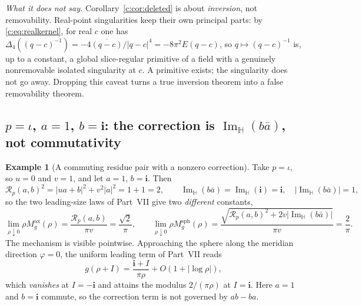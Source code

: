 \documentclass[11pt,a4paper]{article}
\numberwithin{equation}{section}
\theoremstyle{definition}
\newtheorem{example}[theorem]{Example}
\theoremstyle{remark}
\theoremstyle{plain}
\newcommand{\HH}{\mathbb H}
\DeclareMathOperator{\Ima}{Im}
\newcommand{\ImH}{\Ima_{\HH}}
\newcommand{\lap}{\Delta_4}
\newcommand{\Rp}{\mathcal R_{p}}      %
\newcommand{\Msph}{M^{\mathrm{sph}}}                  %
\newcommand{\Max}{M^{\mathrm{ax}}}                    %
\newcommand{\abs}[1]{\lvert #1\rvert}
\begin{document}
\emph{What it does not say.} Corollary~\ref{c:cor:deleted} is about
\emph{inversion}, not removability. Real-point singularities keep their own
principal parts: by \eqref{c:eq:realkernel}, for real $c$ one has
$\lap((q-c)^{-1})=-4\overline{(q-c)}/\abs{q-c}^4=-8\pi^2E(q-c)$, so
$q\mapsto(q-c)^{-1}$ is, up to a constant, a global slice-regular primitive
of a field with a genuinely nonremovable isolated singularity at $c$. A
primitive exists; the singularity does not go away. Dropping this caveat
turns a true inversion theorem into a false removability theorem.

\subsection{$p=\iota$, $a=1$, $b=\mathbf i$: the correction is
$\ImH(b\bar a)$, not commutativity}
\label{f:ex:cancellation}

\begin{example}[A commuting residue pair with a nonzero correction]
\label{f:ex:im-correction}
Take $p=\iota$, so $u=0$ and $v=1$, and let $a=1$, $b=\mathbf i$. Then
\[
 \Rp(a,b)^2=\abs{ua+b}^2+v^2\abs a^2=1+1=2,
 \qquad
 \ImH(b\bar a)=\ImH(\mathbf i)=\mathbf i,
 \quad\abs{\ImH(b\bar a)}=1 ,
\]
so the two leading-size laws of Part~VII give two \emph{different}
constants,
\begin{equation}
 \lim_{\rho\downarrow0}\rho\Max_g(\rho)=\frac{\Rp(a,b)}{\pi v}
 =\frac{\sqrt2}{\pi},
 \qquad
 \lim_{\rho\downarrow0}\rho\Msph_g(\rho)
 =\frac{\sqrt{\Rp(a,b)^2+2v\abs{\ImH(b\bar a)}}}{\pi v}=\frac2\pi .
 \label{f:eq:two-constants}
\end{equation}
The mechanism is visible pointwise. Approaching the sphere along the
meridian direction $\varphi=0$, the uniform leading term of Part~VII reads
\begin{equation}
 g(\rho+I)=\frac{\mathbf i+I}{\pi\rho}+O(1+\abs{\log\rho}),
 \label{f:eq:pointwise-cancellation}
\end{equation}
which \emph{vanishes} at $I=-\mathbf i$ and attains the modulus
$2/(\pi\rho)$ at $I=\mathbf i$. Here $a=1$ and $b=\mathbf i$ commute, so
the correction term is not governed by $ab-ba$.
\end{example}
\end{document}

